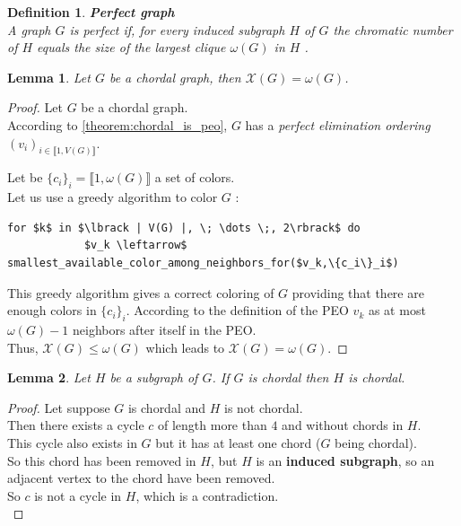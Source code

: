 \documentclass{article}
\newtheorem{definition}{Definition}[section]
\newtheorem{lemma}{Lemma}[section]
\begin{document}
\begin{definition}
    \textbf{Perfect graph} \\
    A graph $G$ is perfect if, for every induced subgraph $H$ of $G$ 
    the chromatic number of $H$ equals the size of the largest clique $\omega(G)$ in $H$ \cite{Chudnovsky2003}.
\end{definition}


\begin{lemma}
    Let $G$ be a chordal graph, then $\mathcal{X}(G)=\omega(G)$.
    \label{lemma:ki_g_eq_omega_g}
\end{lemma}

\begin{proof}
    Let $G$ be a chordal graph.\\
    According to \cref{theorem:chordal_is_peo}, $G$ has a \emph{perfect elimination ordering}
    $(v_i)_{i\in \llbracket 1, V(G) \rrbracket}$. \medskip

    \noindent Let be $\{c_i\}_i = \llbracket 1, \omega(G)\rrbracket$ a set of colors. \\
    Let us use a greedy algorithm to color $G$ :
    
    \begin{lstlisting}[mathescape=true, caption={Greedy algorithm for coloring a chordal graph}, label={lst:greedy_coloring}, frame=single]
        for $k$ in $\lbrack | V(G) |, \; \dots \;, 2\rbrack$ do
            $v_k \leftarrow$ smallest_available_color_among_neighbors_for($v_k,\{c_i\}_i$)
    \end{lstlisting}
    

    \noindent This greedy algorithm gives a correct coloring of $G$ providing that there are enough colors in $\{c_i\}_i$.
    According to the definition of the PEO $v_k$ as at most $\omega(G)-1$ neighbors after itself in the PEO. \\
    \noindent Thus, $\mathcal{X}(G) \leq \omega(G)$ which leads to $\mathcal{X}(G)=\omega(G)$.
\end{proof}


\begin{lemma}
    Let $H$ be a subgraph of $G$. If $G$ is chordal then $H$ is chordal.
    \label{lemma:ind_sub_of_chord_is_chord}
\end{lemma}

\begin{proof}
    Let suppose $G$ is chordal and $H$ is not chordal. \\
    Then there exists a cycle $c$ of length more than $4$ and without chords in $H$. \\
    This cycle also exists in $G$ but it has at least one chord ($G$ being chordal). \\
    So this chord has been removed in $H$, but $H$ is an \textbf{induced subgraph}, so an adjacent vertex to the chord have been removed. \\
    So $c$ is not a cycle in $H$, which is a contradiction.\\
\end{proof}
\end{document}
